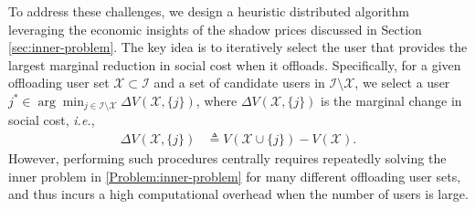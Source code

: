 \documentclass[lettersize,journal]{IEEEtran}
\newcommand{\ie}{\emph{i.e.}}
\begin{document}
To address these challenges, we design a heuristic distributed algorithm leveraging the economic insights of the shadow prices discussed in Section \ref{sec:inner-problem}. The key idea is to iteratively select the user that provides the largest marginal reduction in social cost when it offloads. Specifically, for a given offloading user set $\mathcal{X}\subset\mathcal{I}$ and a set of candidate users in $\mathcal{I}\setminus\mathcal{X}$, we select a user $j^*\in\arg\min_{j\in\mathcal{I}\setminus\mathcal{X}}\Delta V(\mathcal{X}, \{j\})$, where $\Delta V(\mathcal{X}, \{j\})$ is the marginal change in social cost, \ie, 
\begin{align}\label{eq:deltaV}
    \Delta V(\mathcal{X}, \{j\}) &\triangleq V(\mathcal{X} \cup \{j\}) - V(\mathcal{X}).
\end{align}
However, performing such procedures centrally requires repeatedly solving the inner problem in \eqref{Problem:inner-problem} for many different offloading user sets, and thus incurs a high computational overhead when the number of users is large. 
\end{document}
